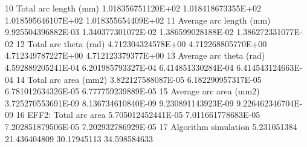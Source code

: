 10	Total arc length (mm)	1.018356751120E+02	1.018418673355E+02	1.018595646107E+02	1.018355654409E+02
11	Average arc length (mm)	9.925504396882E-03	1.340377301072E-02	1.386599028188E-02	1.386272331077E-02
12	Total arc theta (rad)	4.712304324578E+00	4.712268805770E+00	4.712349787227E+00	4.712123379377E+00
13	Average arc theta (rad)	4.592889205241E-04	6.201985793327E-04	6.414851330284E-04	6.414543124663E-04
14	Total arc area (mm2)	3.822127588087E-05	6.182290957317E-05	6.781012634326E-05	6.777759239889E-05
15	Average arc area (mm2)	3.725270553691E-09	8.136734610840E-09	9.230891143923E-09	9.226462346704E-09
16	EFF2: Total arc area 	5.705012452441E-05	7.011661778683E-05	7.202851879506E-05	7.202932786929E-05
17	Algorithm simulation 	5.231051384	        21.436404809	    30.17945113	        34.598584633




